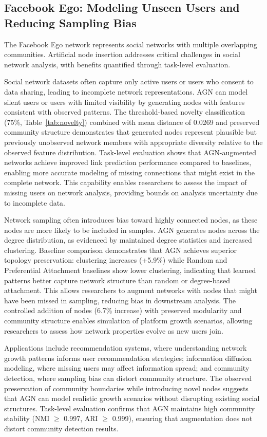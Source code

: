 \documentclass[12pt]{article}
\begin{document}
\subsection{Facebook Ego: Modeling Unseen Users and Reducing Sampling Bias}

The Facebook Ego network represents social networks with multiple overlapping communities. Artificial node insertion addresses critical challenges in social network analysis, with benefits quantified through task-level evaluation.

Social network datasets often capture only active users or users who consent to data sharing, leading to incomplete network representations. AGN can model silent users or users with limited visibility by generating nodes with features consistent with observed patterns. The threshold-based novelty classification (75\%, Table~\ref{tab:novelty}) combined with mean distance of 0.0269 and preserved community structure demonstrates that generated nodes represent plausible but previously unobserved network members with appropriate diversity relative to the observed feature distribution. Task-level evaluation shows that AGN-augmented networks achieve improved link prediction performance compared to baselines, enabling more accurate modeling of missing connections that might exist in the complete network. This capability enables researchers to assess the impact of missing users on network analysis, providing bounds on analysis uncertainty due to incomplete data.

Network sampling often introduces bias toward highly connected nodes, as these nodes are more likely to be included in samples. AGN generates nodes across the degree distribution, as evidenced by maintained degree statistics and increased clustering. Baseline comparison demonstrates that AGN achieves superior topology preservation: clustering increases (+5.9\%) while Random and Preferential Attachment baselines show lower clustering, indicating that learned patterns better capture network structure than random or degree-based attachment. This allows researchers to augment networks with nodes that might have been missed in sampling, reducing bias in downstream analysis. The controlled addition of nodes (6.7\% increase) with preserved modularity and community structure enables simulation of platform growth scenarios, allowing researchers to assess how network properties evolve as new users join.

Applications include recommendation systems, where understanding network growth patterns informs user recommendation strategies; information diffusion modeling, where missing users may affect information spread; and community detection, where sampling bias can distort community structure. The observed preservation of community boundaries while introducing novel nodes suggests that AGN can model realistic growth scenarios without disrupting existing social structures. Task-level evaluation confirms that AGN maintains high community stability (NMI $\geq$ 0.997, ARI $\geq$ 0.999), ensuring that augmentation does not distort community detection results.
\end{document}
